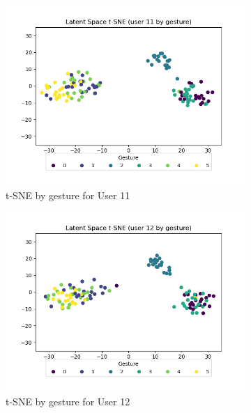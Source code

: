 \begin{figure}[b]
\begin{subfigure}{0.3\textwidth}
		\includegraphics[width=\textwidth]{figures/extended/long_ls_u11}
		\caption{t-SNE by gesture for User 11}
	\end{subfigure}
	\hfill
	\begin{subfigure}{0.3\textwidth}
		\centering
		\includegraphics[width=\textwidth]{figures/extended/long_ls_u12}
		\caption{t-SNE by gesture for User 12}
	\end{subfigure}
	\hfill
	\begin{subfigure}{0.3\textwidth}
		\centering

\end{subfigure}
\end{figure}
